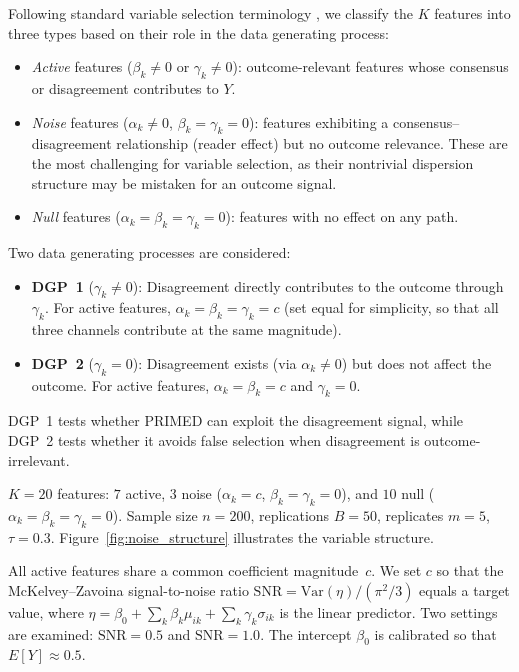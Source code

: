 \documentclass[referee,lineno,pdflatex,sn-vancouver-num]{sn-jnl}
\begin{document}
Following standard variable selection terminology \cite{Tibshirani1996,Yuan2006}, we classify the $K$ features into three types based on their role in the data generating process:
\begin{itemize}
  \item \emph{Active} features ($\beta_k \neq 0$ or $\gamma_k \neq 0$): outcome-relevant features whose consensus or disagreement contributes to $Y$.
  \item \emph{Noise} features ($\alpha_k \neq 0$, $\beta_k = \gamma_k = 0$): features exhibiting a consensus--disagreement relationship (reader effect) but no outcome relevance. These are the most challenging for variable selection, as their nontrivial dispersion structure may be mistaken for an outcome signal.
  \item \emph{Null} features ($\alpha_k = \beta_k = \gamma_k = 0$): features with no effect on any path.
\end{itemize}

Two data generating processes are considered:
\begin{itemize}
  \item \textbf{DGP~1} ($\gamma_k \neq 0$): Disagreement directly contributes to the outcome through $\gamma_k$.
    For active features, $\alpha_k = \beta_k = \gamma_k = c$ (set equal for simplicity, so that all three channels contribute at the same magnitude).
  \item \textbf{DGP~2} ($\gamma_k = 0$): Disagreement exists (via $\alpha_k \neq 0$) but does not affect the outcome.
    For active features, $\alpha_k = \beta_k = c$ and $\gamma_k = 0$.
\end{itemize}
DGP~1 tests whether PRIMED can exploit the disagreement signal, while DGP~2 tests whether it avoids false selection when disagreement is outcome-irrelevant.

$K = 20$ features: $7$ active, $3$ noise ($\alpha_k = c$, $\beta_k = \gamma_k = 0$), and $10$ null ($\alpha_k = \beta_k = \gamma_k = 0$).
Sample size $n = 200$, replications $B = 50$, replicates $m = 5$, $\tau = 0.3$.
Figure~\ref{fig:noise_structure} illustrates the variable structure.

All active features share a common coefficient magnitude~$c$.
We set $c$ so that the McKelvey--Zavoina signal-to-noise ratio $\mathrm{SNR} = \mathrm{Var}(\eta) / (\pi^2/3)$ equals a target value, where $\eta = \beta_0 + \sum_k \beta_k \mu_{ik} + \sum_k \gamma_k \sigma_{ik}$ is the linear predictor.
Two settings are examined: $\mathrm{SNR} = 0.5$ and $\mathrm{SNR} = 1.0$.
The intercept $\beta_0$ is calibrated so that $E[Y] \approx 0.5$.
\end{document}
